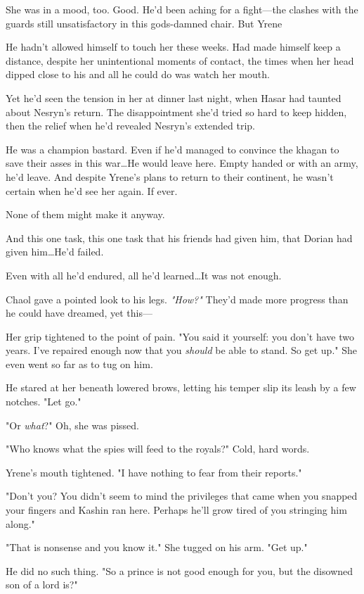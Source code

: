 She was in a mood, too.
Good.
He'd been aching for a fight---the clashes with the guards still unsatisfactory in this gods-damned chair.
But Yrene 

He hadn't allowed himself to touch her these weeks.
Had made himself keep a distance, despite her unintentional moments of contact, the times when her head dipped close to his and all he could do was watch her mouth.

Yet he'd seen the tension in her at dinner last night, when Hasar had taunted about Nesryn's return.
The disappointment she'd tried so hard to keep hidden, then the relief when he'd revealed Nesryn's extended trip.

He was a champion bastard.
Even if he'd managed to convince the khagan to save their asses in this war\ldots He would leave here.
Empty handed or with an army, he'd leave.
And despite Yrene's plans to return to their continent, he wasn't certain when he'd see her again.
If ever.

None of them might make it anyway.

And this one task, this one task that his friends had given him, that Dorian had given him\ldots He'd failed.

Even with all he'd endured, all he'd learned\ldots It was not enough.

Chaol gave a pointed look to his legs.
\emph{"How?"} They'd made more progress than he could have dreamed, yet this---

Her grip tightened to the point of pain.
"You said it yourself: you don't have two years.
I've repaired enough now that you \emph{should} be able to stand.
So get up."
She even went so far as to tug on him.

He stared at her beneath lowered brows, letting his temper slip its leash by a few notches.
"Let go."

"Or \emph{what}?"
Oh, she was pissed.

"Who knows what the spies will feed to the royals?"
Cold, hard words.

Yrene's mouth tightened.
"I have nothing to fear from their reports."

"Don't you?
You didn't seem to mind the privileges that came when you snapped your fingers and Kashin ran here.
Perhaps he'll grow tired of you stringing him along."

"That is nonsense and you know it."
She tugged on his arm.
"Get up."

He did no such thing.
"So a prince is not good enough for you, but the disowned son of a lord is?"

